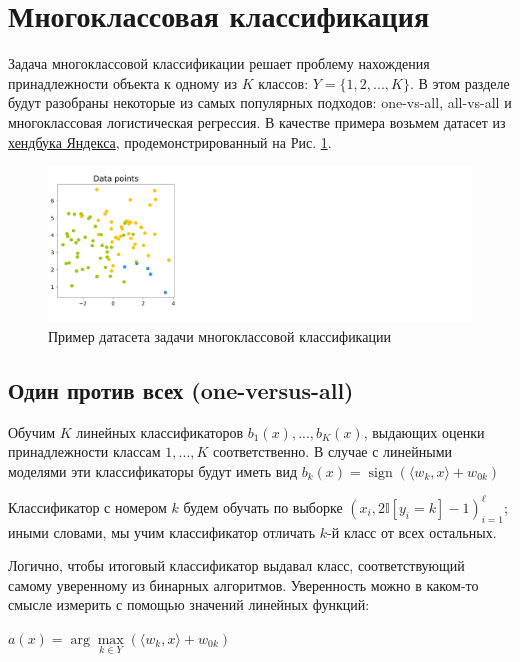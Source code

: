 \section{Многоклассовая классификация}

Задача многоклассовой классификации решает проблему нахождения принадлежности объекта к одному из $K$ классов: $Y = \{1, 2, ..., K\}$. В этом разделе будут разобраны некоторые из самых популярных подходов: one-vs-all, all-vs-all и многоклассовая логистическая регрессия. В качестве примера возьмем датасет из \href{https://education.yandex.ru/handbook/ml/article/linear-models}{хендбука Яндекса}, продемонстрированный на Рис. \ref{fig:linear-multi-dataset}.

\begin{figure}[h]
	\centering
	\includegraphics[width=0.8\linewidth]{chapters/linear/pics/multi-dataset.png}
	\caption{Пример датасета задачи многоклассовой классификации}
	\label{fig:linear-multi-dataset}
\end{figure}

\subsection{Один против всех (one-versus-all)}

Обучим $K$ линейных классификаторов $b_1(x),...,b_K(x)$, выдающих оценки принадлежности классам $1,...,K$ соответственно. В случае с линейными моделями эти классификаторы будут иметь вид $b_k(x) = \operatorname{sign}(\langle w_k, x \rangle+w_{0k})$ 

Классификатор с номером $k$ будем обучать по выборке $(x_i, 2 \mathbb{I}[y_i = k] -1)^\ell_{i=1} $; иными словами, мы учим классификатор отличать $k$-й класс от всех остальных.

Логично, чтобы итоговый классификатор выдавал класс, соответствующий самому уверенному из бинарных алгоритмов. Уверенность можно в каком-то смысле измерить с помощью значений линейных функций:

$ a(x)= \operatorname{arg}\max\limits_{k \in Y} (\langle w_k, x \rangle+w_{0k})$

